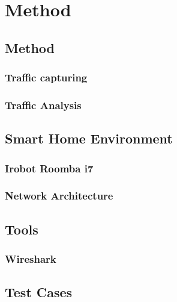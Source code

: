 \chapter*{Method}

\section{Method}

\subsection{Traffic capturing}

\subsection{Traffic Analysis}

\section{Smart Home Environment}

\subsection{Irobot Roomba i7}

\subsection{Network Architecture}

\section{Tools}

\subsection{Wireshark}

\section{Test Cases}
